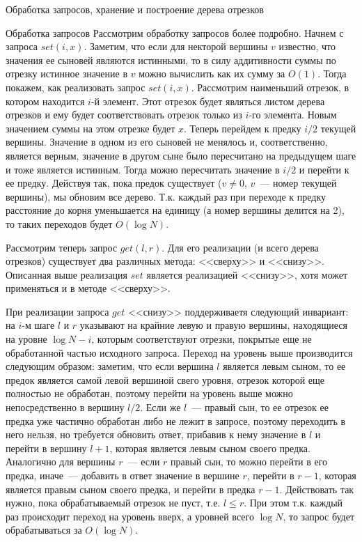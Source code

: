 \begin{section}{Обработка запросов, хранение и построение дерева отрезков}
\begin{subsection}{Обработка запросов}
Рассмотрим обработку запросов более подробно. Начнем с запроса $set(i, x)$. Заметим, 
что если для некторой вершины $v$ известно, что значения ее сыновей являются истинными,
то в силу аддитивности суммы по отрезку истинное значение в $v$ можно вычислить как их
сумму за $O(1)$. Тогда покажем, как реализовать запрос $set(i,x)$. Рассмотрим наименьший
отрезок, в котором находится $i$-й элемент. Этот отрезок будет являться листом дерева 
отрезков и ему будет соответствовать отрезок только из $i$-го элемента. Новым значением 
суммы на этом отрезке будет $x$. Теперь перейдем к предку $i/2$ текущей вершины. Значение в одном
из его сыновей не менялось и, соответственно, является верным, значение в другом сыне
было пересчитано на предыдущем шаге и тоже является истинным. Тогда можно пересчитать
значение в $i/2$ и перейти к ее предку. Действуя так, пока предок существует 
($v \ne 0$, $v$~--- номер текущей вершины), мы обновим все дерево. Т.к. каждый раз при переходе
к предку расстояние до корня уменьшается на единицу (а номер вершины делится на 2), то
таких переходов будет $O(\log N)$.

Рассмотрим теперь запрос $get(l,r)$. Для его реализации (и всего дерева отрезков) существует
два различных метода: <<сверху>> и <<снизу>>. Описанная выше реализация $set$ является 
реализацией <<снизу>>, хотя может применяться и в методе <<сверху>>.

При реализации запроса $get$ <<снизу>> поддерживаетя следующий инвариант: на $i$-м шаге
$l$ и $r$ указывают на крайние левую и правую вершины, находящиеся на уровне $\log {N} - i$, 
которым соответствуют отрезки, покрытые еще не обработанной частью исходного запроса.
Переход на уровень выше производится следующим образом: заметим, что если вершина $l$ является
левым сыном, то ее предок является самой левой вершиной свего уровня, отрезок которой еще
полностью не обработан, поэтому перейти на уровень выше можно непосредственно в вершину $l / 2$. 
Если же $l$~--- правый сын, то ее отрезок ее предка уже частично обработан либо не лежит в 
запросе, поэтому переходить в него нельзя, но требуется обновить ответ, прибавив к нему 
значение в $l$ и перейти в вершину $l + 1$, которая является левым сыном своего предка.
Аналогично для вершины $r$~--- если $r$ правый сын, то можно перейти в его предка, иначе~---
добавить в ответ значение в вершине $r$, перейти в $r - 1$, которая является правым сыном
своего предка, и перейти в предка $r - 1$. Действовать так нужно, пока обрабатываемый отрезок
не пуст, т.е. $l \le r$. При этом т.к. каждый раз происходит переход на уровень вверх,
а уровней всего $\log N$, то запрос будет обрабатываться за $O(\log N)$.


\end{subsection}
\end{section}
